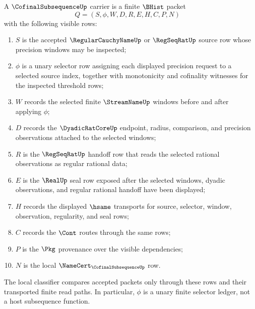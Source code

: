 \begin{definition}
\label{def:cofinalsubsequence-carrier}
A $\CofinalSubsequenceUp$ carrier is a finite $\BHist$ packet
$$
Q=(S,\phi,W,D,R,E,H,C,P,N)
$$
with the following visible rows:
\begin{enumerate}
\item $S$ is the accepted $\RegularCauchyNameUp$ or $\RegSeqRatUp$ source row whose precision windows may be inspected;
\item $\phi$ is a unary selector row assigning each displayed precision request to a selected source index, together with monotonicity and cofinality witnesses for the inspected threshold rows;
\item $W$ records the selected finite $\StreamNameUp$ windows before and after applying $\phi$;
\item $D$ records the $\DyadicRatCoreUp$ endpoint, radius, comparison, and precision observations attached to the selected windows;
\item $R$ is the $\RegSeqRatUp$ handoff row that reads the selected rational observations as regular rational data;
\item $E$ is the $\RealUp$ seal row exposed after the selected windows, dyadic observations, and regular rational handoff have been displayed;
\item $H$ records the displayed $\hsame$ transports for source, selector, window, observation, regularity, and seal rows;
\item $C$ records the $\Cont$ routes through the same rows;
\item $P$ is the $\Pkg$ provenance over the visible dependencies;
\item $N$ is the local $\NameCert_{\CofinalSubsequenceUp}$ row.
\end{enumerate}
The local classifier compares accepted packets only through these rows and their transported finite read paths. In particular, $\phi$ is a unary finite selector ledger, not a host subsequence function.
\end{definition}

